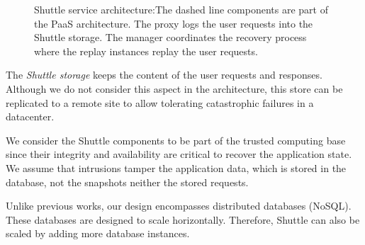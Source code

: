 \begin{figure}[]
\centering
{}

\caption{Shuttle service architecture:The dashed line components are part of the \ac{PaaS} architecture. The proxy logs the user requests into the Shuttle storage. The manager coordinates the recovery process where the replay instances replay the user requests.}
\label{fig:shuttle_architecture}
\end{figure}
  

The \emph{Shuttle storage} keeps the content of the user requests and responses. Although we do not consider this aspect in the architecture, this store can be replicated to a remote site to allow tolerating catastrophic failures in a datacenter.


We consider the Shuttle components to be part of the trusted computing base since their integrity and availability are critical to recover the application state. We assume that intrusions tamper the application data, which is stored in the database, not the snapshots neither the stored requests. 

Unlike previous works, our design encompasses distributed databases (\acs{NoSQL}). These databases are designed to scale horizontally. Therefore, Shuttle can also be scaled by adding more database instances.


